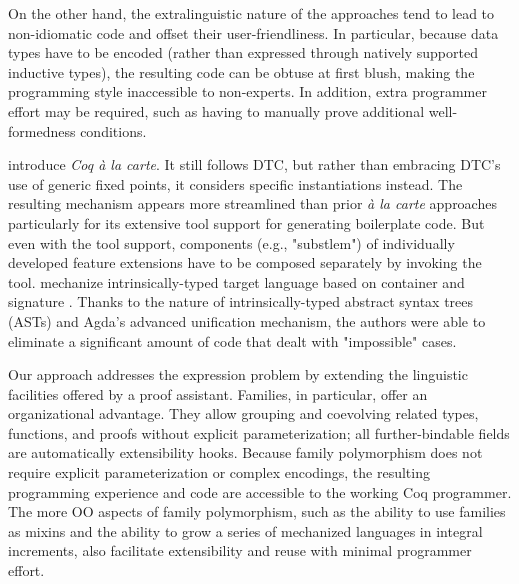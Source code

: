 On the other hand, the extra\-linguistic nature of the approaches tend
to lead to non-idiomatic code and offset their user-friendliness.
In particular, because data types have to be encoded (rather than expressed
through natively supported inductive types), the resulting code can be
obtuse at first blush, making the programming style inaccessible to non-experts.
In addition, extra programmer effort may be required, such as
having to manually prove additional well-formedness conditions. %

\citet{forsta2020} introduce \emph{Coq à la carte}.
It still follows DTC, but rather than embracing DTC's use of generic
fixed points, it considers specific instantiations instead.
The resulting mechanism appears more streamlined than prior \emph{à la
carte} approaches particularly for its extensive tool support for generating boilerplate code.
%
But even with the tool support, components (e.g., "substlem") of
individually developed feature extensions have to be composed separately
by invoking the tool. \citet{vdr2022intrinsically} mechanize intrinsically-typed
target language based on container and signature \cite{morris2009indexed}. 
Thanks to the nature of intrinsically-typed abstract syntax trees (ASTs) and Agda's advanced unification mechanism, the authors were able to eliminate a significant amount of code that dealt with "impossible" cases.
%

Our approach addresses the expression problem by extending the
linguistic facilities offered by a proof assistant.
Families, in particular, offer an organizational advantage.  They allow
grouping and coevolving related types, functions, and proofs without
explicit parameterization;
all further-bindable fields are automatically extensibility hooks.
Because family polymorphism does not require explicit parameterization
or complex encodings,
the resulting programming experience and code are accessible to the
working Coq programmer.
The more OO aspects of family polymorphism, such as the ability to
use families as mixins and the ability to grow a series of mechanized
languages in integral increments, also facilitate extensibility and
reuse
with minimal programmer effort.

